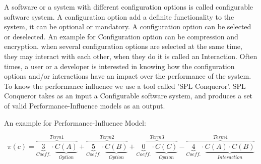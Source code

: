 \label{background}


 
A software or a system with different configuration options is called configurable software system. A configuration option add a definite functionality to the system, it can be optional or mandatory. A configuration option can be selected or deselected. An example for Configuration option can be compression and encryption.
when several configuration options are selected at the same time, they may interact with each other, when they do it is called an Interaction.
Often times, a user or a developer is interested in knowing how the configuration options and/or interactions have an impact over the performance of the system. To know the performance influence we use a tool called 'SPL Conqueror'.
SPL Conqueror takes as an input a Configurable software system, and produces a set of valid Performance-Influence models as an output.

An example for Performance-Influence Model: 

\begin{equation*}
  \pi {(c)} = \overbrace{\underbrace {3}_{Coeff.} \cdot  \underbrace{{C(A)}}_{Option}}^{Term 1}  + \overbrace{ \underbrace{5}_{Coeff.} \cdot \underbrace{{C(B)}}_{Option}}^{Term 2} + \overbrace{\underbrace{0}_{Coeff.} \cdot \underbrace{{C(C)}}_{Option}}^{Term 3} - \overbrace{\underbrace{4}_{Coeff.} \cdot \underbrace{{ C(A)} \cdot {C(B)}}_{Interaction}}^{Term 4}
\end{equation*}


